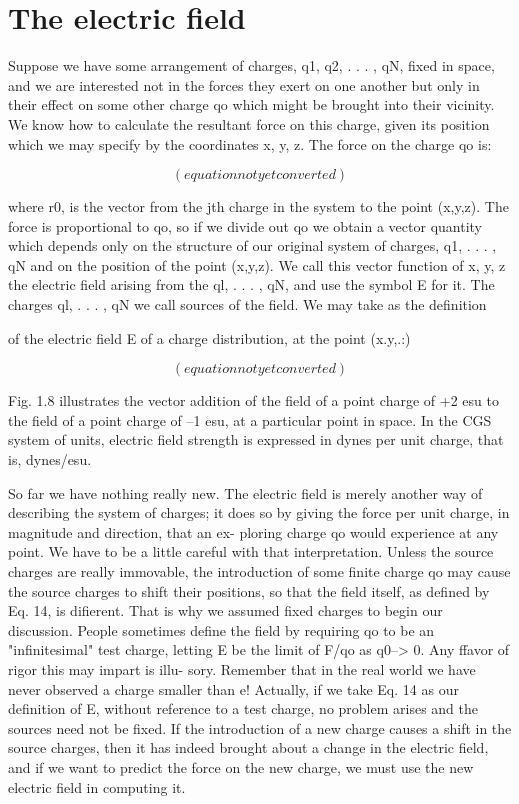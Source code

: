 \section{The electric field}

Suppose we have some arrangement of charges, q1, q2, . . . , qN,
fixed in space, and we are interested not in the forces they exert on
one another but only in their effect on some other charge qo which
might be brought into their vicinity. We know how to calculate the
resultant force on this charge, given its position which we may specify
by the coordinates x, y, z. The force on the charge qo is:

\begin{equation}(equation not yet converted)\end{equation}

where r0, is the vector from the jth charge in the system to the point
(x,y,z). The force is proportional to qo, so if we divide out qo we
obtain a vector quantity which depends only on the structure of our
original system of charges, q1, . . . , qN and on the position of the point
(x,y,z). We call this vector function of x, y, z the electric field arising
from the ql, . . . , qN, and use the symbol E for it. The charges
ql, . . . , qN we call sources of the field. We may take as the definition

of the electric field E of a charge distribution, at the point (x.y,.:)

\begin{equation}(equation not yet converted)\end{equation}

Fig. 1.8 illustrates the vector addition of the field of a point charge
of +2 esu to the field of a point charge of --1 esu, at a particular
point in space. In the CGS system of units, electric field strength is
expressed in dynes per unit charge, that is, dynes/esu.

So far we have nothing really new. The electric field is merely
another way of describing the system of charges; it does so by giving
the force per unit charge, in magnitude and direction, that an ex-
ploring charge qo would experience at any point. We have to be a
little careful with that interpretation. Unless the source charges are
really immovable, the introduction of some finite charge qo may
cause the source charges to shift their positions, so that the field itself,
as defined by Eq. 14, is difierent. That is why we assumed fixed
charges to begin our discussion. People sometimes define the field
by requiring qo to be an "infinitesimal" test charge, letting E be the
limit of F/qo as q0--> 0. Any ffavor of rigor this may impart is illu-
sory. Remember that in the real world we have never observed a
charge smaller than e! Actually, if we take Eq. 14 as our definition
of E, without reference to a test charge, no problem arises and the
sources need not be fixed. If the introduction of a new charge
causes a shift in the source charges, then it has indeed brought about
a change in the electric field, and if we want to predict the force on
the new charge, we must use the new electric field in computing it.


